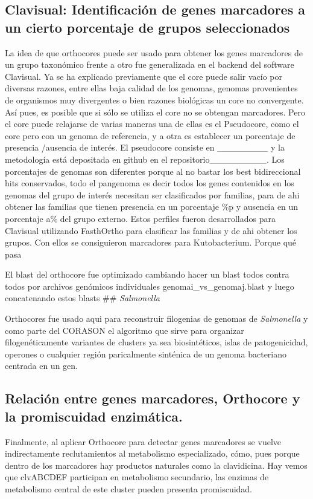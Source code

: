 \documentclass[]{article}
\begin{document}
\subsection{Clavisual: Identificación de genes marcadores a un cierto
porcentaje de grupos
seleccionados}\label{clavisual-identificacion-de-genes-marcadores-a-un-cierto-porcentaje-de-grupos-seleccionados}

La idea de que orthocores puede ser usado para obtener los genes
marcadores de un grupo taxonómico frente a otro fue generalizada en el
backend del software Clavisual. Ya se ha explicado previamente que el
core puede salir vacío por diversas razones, entre ellas baja calidad de
los genomas, genomas provenientes de organismos muy divergentes o bien
razones biológicas un core no convergente. Así pues, es posible que si
sólo se utiliza el core no se obtengan marcadores. Pero el core puede
relajarse de varias maneras una de ellas es el Pseudocore, como el core
pero con un genoma de referencia, y a otra es establecer un porcentaje
de presencia /ausencia de interés. El pseudocore consiste en
\_\_\_\_\_\_\_\_ y la metodología está depositada en github en el
repositorio\_\_\_\_\_\_\_\_\_. Los porcentajes de genomas son diferentes
porque al no bastar los best bidireccional hits conservados, todo el
pangenoma es decir todos los genes contenidos en los genomas del grupo
de interés necesitan ser clasificados por familias, para de ahi obtener
las familias que tienen presencia en un porcentaje \%p y ausencia en un
porcentaje a\% del grupo externo. Estos perfiles fueron desarrollados
para Clavisual utilizando FasthOrtho para clasificar las familias y de
ahi obtener los grupos. Con ellos se consiguieron marcadores para
Kutobacterium. Porque qué pasa

El blast del orthocore fue optimizado cambiando hacer un blast todos
contra todos por archivos genómicos individuales
genomai\_vs\_genomaj.blast y luego concatenando estos blasts \#\#
\emph{Salmonella}

Orthocores fue usado aqui para reconstruir filogenias de genomas de
\emph{Salmonella} y como parte del CORASON el algoritmo que sirve para
organizar filogenéticamente variantes de clusters ya sea biosintéticos,
islas de patogenicidad, operones o cualquier región paricalmente
sinténica de un genoma bacteriano centrada en un gen.

\subsection{Relación entre genes marcadores, Orthocore y la promiscuidad
enzimática.}\label{relacion-entre-genes-marcadores-orthocore-y-la-promiscuidad-enzimatica.}

Finalmente, al aplicar Orthocore para detectar genes marcadores se
vuelve indirectamente reclutamientos al metabolismo especializado, cómo,
pues porque dentro de los marcadores hay productos naturales como la
clavidicina. Hay vemos que clvABCDEF participan en metabolismo
secundario, las enzimas de metabolismo central de este cluster pueden
presenta promiscuidad.
\end{document}
